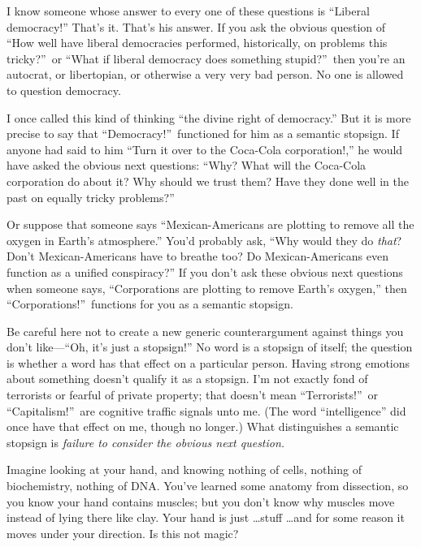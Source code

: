 {
 I know someone whose answer to every one of these questions is
``Liberal democracy!''
That's it. That's his answer. If you
ask the obvious question of ``How well have liberal
democracies performed, historically, on problems this
tricky?''~or ``What if liberal
democracy does something stupid?''~then
you're an autocrat, or libertopian, or otherwise a very
very bad person. No one is allowed to question democracy.}

{
 I once called this kind of thinking ``the divine
right of democracy.'' But it is more precise to say
that ``Democracy!''~functioned for
him as a semantic stopsign. If anyone had said to him
``Turn it over to the Coca-Cola
corporation!,'' he would have asked the obvious next
questions: ``Why? What will the Coca-Cola corporation
do about it? Why should we trust them? Have they done well in the past
on equally tricky problems?''}

{
 Or suppose that someone says ``Mexican-Americans
are plotting to remove all the oxygen in Earth's
atmosphere.'' You'd probably ask,
``Why would they do \textit{that}?
Don't Mexican-Americans have to breathe too? Do
Mexican-Americans even function as a unified
conspiracy?'' If you don't ask these
obvious next questions when someone says,
``Corporations are plotting to remove
Earth's oxygen,'' then
``Corporations!''~functions for you
as a semantic stopsign.}

{
 Be careful here not to create a new generic counterargument
against things you don't like---``Oh,
it's just a stopsign!'' No word is a
stopsign of itself; the question is whether a word has that effect on a
particular person. Having strong emotions about something
doesn't qualify it as a stopsign. I'm
not exactly fond of terrorists or fearful of private property; that
doesn't mean
``Terrorists!''~or
``Capitalism!''~are cognitive
traffic signals unto me. (The word
``intelligence'' did once have that
effect on me, though no longer.) What distinguishes a semantic stopsign
is \textit{failure to consider the obvious next question.}}

\myendsectiontext


{
 Imagine looking at your hand, and knowing nothing of cells,
nothing of biochemistry, nothing of DNA. You've learned
some anatomy from dissection, so you know your hand contains muscles;
but you don't know why muscles move instead of lying
there like clay. Your hand is just \ldots stuff \ldots and for some
reason it moves under your direction. Is this not magic?}

